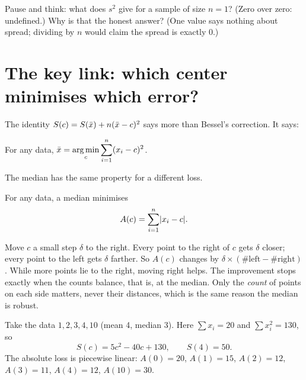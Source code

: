 \begin{recoverybox}
Pause and think: what does $s^2$ give for a sample of size $n=1$? (Zero over zero:
undefined.) Why is that the honest answer? (One value says nothing about spread;
dividing by $n$ would claim the spread is exactly $0$.)
\end{recoverybox}

\section{The key link: which center minimises which error?}
\label{sec:center-spread-loss}

The identity $S(c) = S(\bar{x}) + n(\bar{x} - c)^2$ says more than Bessel's correction.
It says:

\begin{theorem}
For any data, $\displaystyle \bar{x} = \operatorname*{arg\,min}_c \sum_{i=1}^n (x_i - c)^2$.
\end{theorem}

The median has the same property for a different loss.

\begin{theorem}
For any data, a median minimises
\[
  A(c) = \sum_{i=1}^n \lvert x_i - c\rvert .
\]
\end{theorem}

\begin{whybox}
Move $c$ a small step $\delta$ to the right. Every point to the right of $c$ gets
$\delta$ closer; every point to the left gets $\delta$ farther. So $A(c)$ changes by
$\delta \times (\#\text{left} - \#\text{right})$. While more points lie to the right,
moving right helps. The improvement stops exactly when the counts balance, that is,
at the median. Only the \emph{count} of points on each side matters, never their
distances, which is the same reason the median is robust.
\end{whybox}

Take the data $1, 2, 3, 4, 10$ (mean 4, median 3). Here $\sum x_i = 20$ and
$\sum x_i^2 = 130$, so
\[
  S(c) = 5c^2 - 40c + 130, \qquad S(4) = 50 .
\]
The absolute loss is piecewise linear: $A(0) = 20$, $A(1)=15$, $A(2)=12$, $A(3) = 11$,
$A(4) = 12$, $A(10) = 30$.

